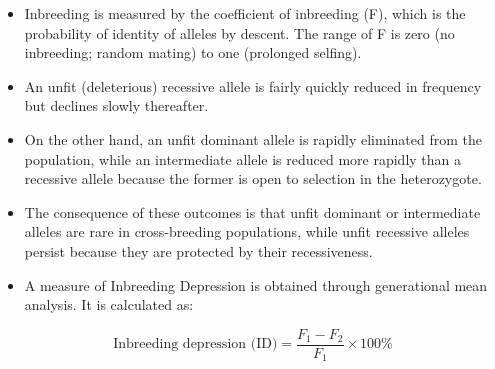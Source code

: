 \documentclass[11pt,dvipsnames,ignorenonframetext,aspectratio=169]{beamer}
\providecommand{\tightlist}{%
  \setlength{\itemsep}{0pt}\setlength{\parskip}{0pt}}
\begin{document}
\begin{frame}{}
\protect\hypertarget{section-10}{}

\begin{itemize}
\tightlist
\item
  Inbreeding is measured by the coefficient of inbreeding (F), which is
  the probability of identity of alleles by descent. The range of F is
  zero (no inbreeding; random mating) to one (prolonged selfing).
\item
  An unfit (deleterious) recessive allele is fairly quickly reduced in
  frequency but declines slowly thereafter.
\item
  On the other hand, an unfit dominant allele is rapidly eliminated from
  the population, while an intermediate allele is reduced more rapidly
  than a recessive allele because the former is open to selection in the
  heterozygote.
\item
  The consequence of these outcomes is that unfit dominant or
  intermediate alleles are rare in cross-breeding populations, while
  unfit recessive alleles persist because they are protected by their
  recessiveness.
\end{itemize}

\end{frame}

\begin{frame}{}
\protect\hypertarget{section-11}{}

\begin{itemize}
\tightlist
\item
  A measure of Inbreeding Depression is obtained through generational
  mean analysis. It is calculated as:
\end{itemize}

\[
\text{Inbreeding depression (ID)} = \frac{F_1 - F_2}{F_1} \times 100\%
\]

\end{frame}
\end{document}
